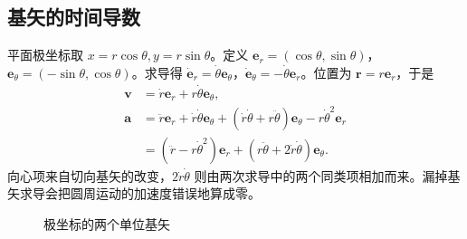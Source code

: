 \documentclass[11pt,openany,fontset=fandol]{ctexbook}
\theoremstyle{plain}\newtheorem{theorem}{定理}[chapter]\newtheorem{proposition}[theorem]{命题}
\theoremstyle{definition}\newtheorem{definition}{定义}[chapter]\newtheorem{example}{例}[chapter]
\theoremstyle{remark}\newtheorem*{remark}{说明}
\newcommand{\vct}[1]{\bm{#1}}\newcommand{\Rea}{\operatorname{Re}}\newcommand{\Ima}{\operatorname{Im}}
\begin{document}
\subsection{基矢的时间导数}
平面极坐标取 $x=r\cos\theta,y=r\sin\theta$。定义 $\vct e_r=(\cos\theta,\sin\theta)$，$\vct e_\theta=(-\sin\theta,\cos\theta)$。求导得 $\dot{\vct e}_r=\dot\theta\vct e_\theta$，$\dot{\vct e}_\theta=-\dot\theta\vct e_r$。位置为 $\vct r=r\vct e_r$，于是
\begin{align}
\vct v&=\dot r\vct e_r+r\dot\theta\vct e_\theta,\\
\vct a&=\ddot r\vct e_r+\dot r\dot\theta\vct e_\theta
+(\dot r\dot\theta+r\ddot\theta)\vct e_\theta-r\dot\theta^2\vct e_r\\
&=(\ddot r-r\dot\theta^2)\vct e_r+(r\ddot\theta+2\dot r\dot\theta)\vct e_\theta.
\end{align}
向心项来自切向基矢的改变，$2\dot r\dot\theta$ 则由两次求导中的两个同类项相加而来。漏掉基矢求导会把圆周运动的加速度错误地算成零。

\begin{figure}[htbp]
\centering
{}
\caption{极坐标的两个单位基矢}\label{fig:polar-basis}
\end{figure}
\end{document}
